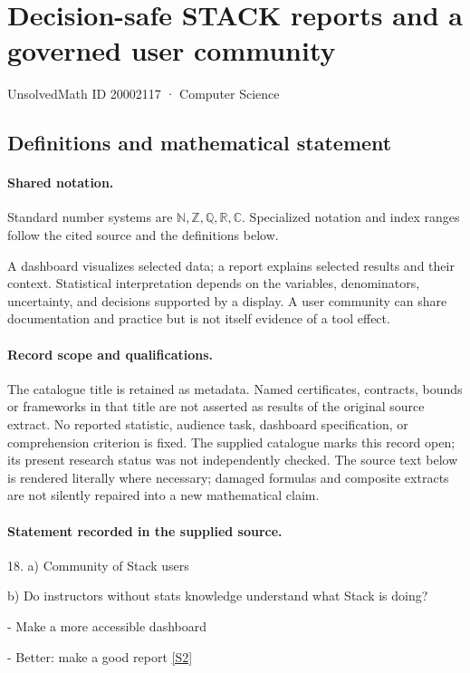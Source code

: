 \documentclass[11pt]{article}
\newcommand{\sref}[2]{\hyperlink{source:#1:#2}{[S#2]}}
\begin{document}
\setcounter{section}{20002116}
\section{Decision-safe STACK reports and a governed user community}\label{20002117}
{\small\sffamily UnsolvedMath ID 20002117 · Computer Science}
\subsection{Definitions and mathematical statement}

\paragraph{Shared notation.}Standard number systems are $\mathbb N,\mathbb Z,\mathbb Q,\mathbb R,\mathbb C$. Specialized notation and index ranges follow the cited source and the definitions below.


A dashboard visualizes selected data; a report explains selected results and their context. Statistical interpretation depends on the variables, denominators, uncertainty, and decisions supported by a display. A user community can share documentation and practice but is not itself evidence of a tool effect.
\paragraph{Record scope and qualifications.}
The catalogue title is retained as metadata. Named certificates, contracts, bounds or frameworks in that title are not asserted as results of the original source extract.
No reported statistic, audience task, dashboard specification, or comprehension criterion is fixed. The supplied catalogue marks this record open; its present research status was not independently checked.
The source text below is rendered literally where necessary; damaged formulas and composite extracts are not silently repaired into a new mathematical claim.
\paragraph{Statement recorded in the supplied source.}
18. a) Community of Stack users

b) Do instructors without stats knowledge understand what Stack is doing?

- Make a more accessible dashboard

- Better: make a good report \sref{20002117}{2}
\end{document}
